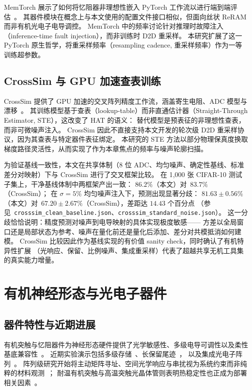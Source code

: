 MemTorch 展示了如何将忆阻器非理想性嵌入 PyTorch 工作流以进行端到端评估~\citep{lammie2022memtorch}。
其器件模块在概念上与本文使用的配置文件接口相似，但面向丝状 ReRAM 而非有机光电子电导调控。
MemTorch 中的频率讨论针对推理时故障注入（inference-time fault injection），而非训练时 D2D 重采样。
本研究扩展了这一 PyTorch 原生哲学，将重采样频率（resampling cadence, 重采样频率）作为一等训练超参数。

\subsection{CrossSim 与 GPU 加速查表训练}

CrossSim 提供了 GPU 加速的交叉阵列精度工作流，涵盖寄生电阻、ADC 模型与漂移~\citep{crosssim2024}。
其训练模型基于查表（lookup-table）而非直通估计器（Straight-Through Estimator, STE），这改变了 HAT 的语义：
替代模型是预表征的非理想性查表，而非可微噪声注入。
CrossSim 因此不直接支持本文开发的轮次级 D2D 重采样协议，因为其查表与特定器件表征绑定。
本研究的 STE 方法以部分物理保真度换取梯度路径灵活性，从而实现了作为本章焦点的频率与噪声轮廓扫描。

为验证基线一致性，本文在共享体制（8 位 ADC、均匀噪声、确定性基线、标准差分对映射）下与 CrossSim 进行了交叉框架比较。
在 1{,}000 张 CIFAR-10 测试子集上，干净基线体制中两框架产出一致：
$86.2\%$（本文）对~$83.7\%$（CrossSim）；
在 $\sigma=5\%$ 均匀噪声注入下，预测出现显著分歧：
$81.63\pm0.56\%$（本文）对~$67.20\pm2.67\%$（CrossSim），差距达 $14.43$ 个百分点
（参见~\texttt{crosssim\_clean\_baseline.json}、\texttt{crosssim\_standard\_noise.json}）。
这一分歧恰恰说明：精度预测对噪声到电导映射的具体实现极度敏感——
方差以全局窗口还是局部状态为参考、噪声在量化前还是量化后添加、差分对共模抵消如何建模。
CrossSim 比较因此作为基线实现的有价值 sanity check，同时确认了有机特异性扩展
（光响应、保留、比例噪声、集成重采样）代表了超越共享无机工具集的真实能力增量。

\section{有机神经形态与光电子器件}

\subsection{器件特性与近期进展}

有机突触与忆阻器件为神经形态硬件提供了光学敏感性、多级电导可调性以及柔性基底兼容性~\citep{xu2025emerging,photonics2025organicreview,beller2024organicneurons,ji2025singleoectneuron}。
近期实验演示包括多级存储~\citep{guo2024organic,jung2024organicfilaments}、长保留尾迹~\citep{zeng2023organicmemristor}，
以及集成光电子阵列~\citep{gebregiorgis2023organiccim,zhang2025opect,zhang2025mooptoelectronic,cui2025multimode}。
阵列级研究开始将主动矩阵寻址、空间光学响应与串扰视为系统约束而非纯粹的材料观测~\citep{visionarch2023crosstalk,amspa2024insensor,jang2023insensor}；
耐温有机突触与高温突触光晶体管则表明热稳定性也正成为部署相关因素~\citep{fuller2020tempresilient,guo2024hightemp}。

